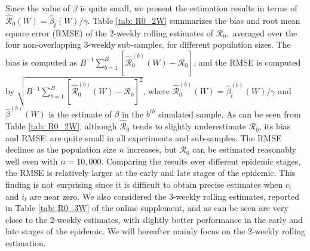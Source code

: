\documentclass[12pt]{article}
\begin{document}
Since the value of $\beta$ is quite small, we present the estimation results
in terms of $\mathcal{\hat{R}}_{0}\left(  W\right)  =\hat{\beta}_{t}\left(
W\right)  /\gamma$. Table \ref{tab: R0_2W} summarizes the bias and root mean
square error (RMSE) of the 2-weekly rolling estimates of $\mathcal{R}_{0},$
averaged over the four non-overlapping 3-weekly sub-samples, for different
population sizes. The bias is computed as $B^{-1}\sum_{b=1}^{B}\left[
\mathcal{\hat{R}}_{0}^{\left(  b\right)  }\left(  W\right)  -\mathcal{R}%
_{0}\right]  $, and the RMSE is computed by $\sqrt{B^{-1}\sum_{b=1}^{B}\left[
\mathcal{\hat{R}}_{0}^{\left(  b\right)  }\left(  W\right)  -\mathcal{R}%
_{0}\right]  ^{2}}$, where $\mathcal{\hat{R}}_{0}^{\left(  b\right)  }\left(
W\right)  =\hat{\beta}_{t}^{(b)}\left(  W\right)  /\gamma$ and $\hat{\beta
}^{(b)}\left(  W\right)  $ is the estimate of $\beta$ in the $b^{th}$
simulated sample. As can be seen from Table \ref{tab: R0_2W}, although
$\mathcal{\hat{R}}_{0}$ tends to slightly underestimate $\mathcal{R}_{0}$, its
bias and RMSE\ are quite small in all experiments and sub-samples. The RMSE
declines as the population size $n$ increases, but $\mathcal{R}_{0}$ can be
estimated reasonably well even with $n=10,000$. Comparing the results over
different epidemic stages, the RMSE is relatively larger at the early and late
stages of the epidemic. This finding is not surprising since it is difficult
to obtain precise estimates when $c_{t}$ and $i_{t}$ are near zero. We also
considered the 3-weekly rolling estimates, reported in Table \ref{tab: R0_3W}
of the online supplement, and as can be seen are very close to the 2-weekly
estimates, with slightly better performance in the early and late stages of
the epidemic. We will hereafter mainly focus on the 2-weekly rolling estimation.%
\end{document}
